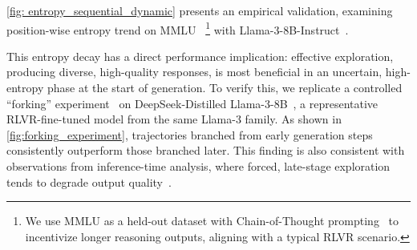 



\cref{fig: entropy_sequential_dynamic} presents an empirical validation,  examining position-wise entropy trend on MMLU ~\citep{hendrycks2021measuring}\footnote{We use MMLU as a held-out dataset with Chain-of-Thought prompting~\citep{wei2022chain} to incentivize longer reasoning outputs, aligning with a typical RLVR scenario.} with Llama-3-8B-Instruct~\citep{grattafiori2024llama}.

This entropy decay has a direct performance implication: effective exploration, producing diverse, high-quality responses, is most beneficial in an uncertain, high-entropy phase at the start of generation.
%
To verify this, we replicate a controlled ``forking'' experiment~\citep{yang2025alignment} on DeepSeek-Distilled Llama-3-8B~\citep{guo2025deepseek}, a representative RLVR-fine-tuned model from the same Llama-3 family. 
%
As shown in \cref{fig:forking_experiment}, trajectories branched from early generation steps consistently outperform those branched later. 
%
This finding is also consistent with observations from inference-time analysis, where forced, late-stage exploration tends to degrade output quality~\citep{liao2025lost, yang2025alignment, fu2025deep}.
%

